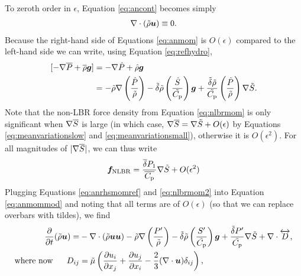 \documentclass[12pt]{article}
\begin{document}
To zeroth order in $\epsilon$, Equation \eqref{eq:ancont} becomes simply
\begin{align}\label{eq:ancontref}
	\nabla\cdot(\tilde{\rho}\bm{u})\equiv0.
\end{align}
Because the right-hand side of Equations \eqref{eq:anmom} is $O(\epsilon)$ compared to the left-hand side we can write, using Equation \eqref{eq:refhydro},
\begin{align}\label{eq:anrhsmomref}
	[-\nabla \overline{P} + \overline{\rho}\bm{g}] &= -\nabla \hat{P} + \hat{\rho}\bm{g}\nonumber\\
	&= -\tilde{\rho}\nabla\left(\frac{\hat{P}}{\tilde{\rho}}\right) - \tilde{\delta}  \tilde{\rho} \left(\frac{\hat{S}}{\tilde{C_{\rm{p}}}}\right) \bm{g} + \frac{\tilde{\delta} \tilde{\rho}}{\tilde{C_{\rm{p}}}} \left(\frac{\hat{P}}{\tilde{\rho}}\right)\nabla\tilde{S}.
\end{align}
Note that the non-LBR force density from Equation \eqref{eq:nlbrmom} is only significant when $\nabla\overline{S}$ is large (in which case, $\nabla\overline{S}=\nabla\tilde{S}+O(\epsilon)$ by Equations \eqref{eq:meanvariationslow} and \eqref{eq:meanvariationsmall}), otherwise it is $O(\epsilon^2)$. For all magnitudes of $|\nabla\overline{S}|$, we can thus write
\begin{align}\label{eq:nlbrmom2}
	\bm{f}_{\rm NLBR} = \frac{\overline{\delta} P_1}{\overline{C_{\rm{p}}}} \nabla\tilde{S} + O(\epsilon^2)
\end{align}
Plugging Equations \eqref{eq:anrhsmomref} and \eqref{eq:nlbrmom2} into Equation \eqref{eq:anmommod} and noting that all terms are of $O(\epsilon)$ (so that we can replace overbars with tildes), we find
\begin{subequations}\label{eq:anmomref}
	\begin{align}\label{eq:anmomrefmain}
	\frac{\partial}{\partial t}(\tilde{\rho}\bm{u})= &-\nabla\cdot(\tilde{\rho}\bm{u}\bm{u}) -\tilde{\rho}\nabla\left(\frac{P^\prime}{\tilde{\rho}}\right) - \tilde{\delta} \tilde{\rho} \left(\frac{S^\prime}{\tilde{C_{\rm{p}}}}\right) \bm{g} +\frac{\tilde{\delta}  P^\prime}{\tilde{C_{\rm{p}}}} \nabla\tilde{S}+\nabla\cdot \overleftrightarrow{D},\\
	\text{where now}\ \ \ \ \  D_{ij}& = \tilde{\mu}\left(\frac{\partial u_i}{\partial x_j} + \frac{\partial u_j}{\partial x_i} - \frac{2}{3}(\nabla\cdot\bm{u})\delta_{ij}\right)\label{eq:anmomrefvisc},
\end{align}
\end{subequations}
\end{document}

